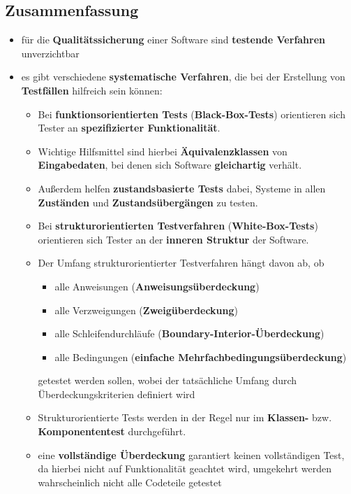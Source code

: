 \subsection*{Zusammenfassung}
\begin{itemize}
    \item für die \textbf{Qualitätssicherung} einer Software sind \textbf{testende Verfahren} unverzichtbar
    \item es gibt verschiedene \textbf{systematische Verfahren}, die bei der Erstellung von \textbf{Testfällen} hilfreich sein können:
    \begin{itemize}
        \item Bei \textbf{funktionsorientierten Tests} (\textbf{Black-Box-Tests}) orientieren sich Tester an \textbf{spezifizierter Funktionalität}.
        \item[] Wichtige Hilfsmittel sind hierbei \textbf{Äquivalenzklassen} von \textbf{Eingabedaten}, bei denen sich Software \textbf{gleichartig} verhält.
        \item[] Außerdem helfen \textbf{zustandsbasierte Tests} dabei, Systeme in allen \textbf{Zuständen} und \textbf{Zustandsübergängen} zu testen.
        \item Bei \textbf{strukturorientierten Testverfahren} (\textbf{White-Box-Tests}) orientieren sich Tester an der \textbf{inneren Struktur} der Software.
        \item[] Der Umfang strukturorientierter Testverfahren hängt davon ab, ob
        \begin{itemize}
            \item alle Anweisungen (\textbf{Anweisungsüberdeckung})
            \item alle Verzweigungen (\textbf{Zweigüberdeckung})
            \item alle Schleifendurchläufe (\textbf{Boundary-Interior-Überdeckung})
            \item alle Bedingungen (\textbf{einfache Mehrfachbedingungsüberdeckung})
        \end{itemize}
        \noindent getestet werden sollen, wobei der tatsächliche Umfang durch Überdeckungskriterien  definiert wird
        \item[] Strukturorientierte Tests werden in der Regel nur im \textbf{Klassen-} bzw. \textbf{Komponententest} durchgeführt.
        \item eine \textbf{vollständige Überdeckung} garantiert keinen vollständigen Test, da hierbei nicht auf Funktionalität geachtet wird, umgekehrt werden wahrscheinlich nicht alle Codeteile getestet

\end{itemize}
\end{itemize}
